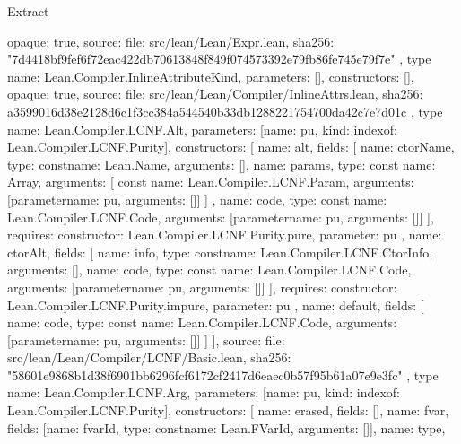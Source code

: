 \begin{lexlean}{Extract}
\begin{toolingmodule}
{{      opaque: true,
      source: {
        file: src/lean/Lean/Expr.lean,
        sha256: "7d4418bf9fef6f72eac422db70613848f849f074573392e79fb86fe745e79f7e"
      }
    },
    type{
      name: Lean.Compiler.InlineAttributeKind,
      parameters: [],
      constructors: [],
      opaque: true,
      source: {
        file: src/lean/Lean/Compiler/InlineAttrs.lean,
        sha256: a3599016d38e2128d6c1f3cc384a544540b33db1288221754700da42c7e7d01c
      }
    },
    type{
      name: Lean.Compiler.LCNF.Alt,
      parameters: [{name: pu, kind: index{of: Lean.Compiler.LCNF.Purity}}],
      constructors: [
        {
          name: alt,
          fields: [
            {name: ctorName, type: const{name: Lean.Name, arguments: []}},
            {
              name: params,
              type: const{
                name: Array,
                arguments: [
                  const{
                    name: Lean.Compiler.LCNF.Param,
                    arguments: [parameter{name: pu, arguments: []}]
                  }
                ]
              }
            },
            {
              name: code,
              type: const{
                name: Lean.Compiler.LCNF.Code,
                arguments: [parameter{name: pu, arguments: []}]
              }
            }
          ],
          requires: {constructor: Lean.Compiler.LCNF.Purity.pure, parameter: pu}
        },
        {
          name: ctorAlt,
          fields: [
            {name: info, type: const{name: Lean.Compiler.LCNF.CtorInfo, arguments: []}},
            {
              name: code,
              type: const{
                name: Lean.Compiler.LCNF.Code,
                arguments: [parameter{name: pu, arguments: []}]
              }
            }
          ],
          requires: {constructor: Lean.Compiler.LCNF.Purity.impure, parameter: pu}
        },
        {
          name: default,
          fields: [
            {
              name: code,
              type: const{
                name: Lean.Compiler.LCNF.Code,
                arguments: [parameter{name: pu, arguments: []}]
              }
            }
          ]
        }
      ],
      source: {
        file: src/lean/Lean/Compiler/LCNF/Basic.lean,
        sha256: "58601e9868b1d38f6901bb6296fcf6172cf2417d6eaec0b57f95b61a07e9e3fc"
      }
    },
    type{
      name: Lean.Compiler.LCNF.Arg,
      parameters: [{name: pu, kind: index{of: Lean.Compiler.LCNF.Purity}}],
      constructors: [
        {name: erased, fields: []},
        {name: fvar, fields: [{name: fvarId, type: const{name: Lean.FVarId, arguments: []}}]},
        {
          name: type,
}}}
\end{toolingmodule}
\end{lexlean}
